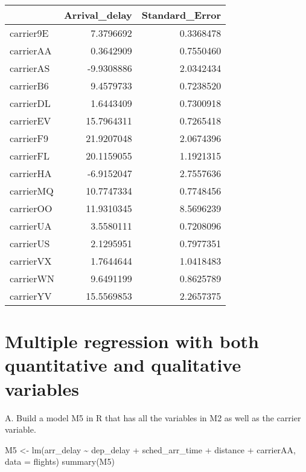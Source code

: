 \documentclass[
]{article}
\newenvironment{Shaded}{\begin{snugshade}}{\end{snugshade}}
\newcommand{\AttributeTok}[1]{\textcolor[rgb]{0.77,0.63,0.00}{#1}}
\newcommand{\FunctionTok}[1]{\textcolor[rgb]{0.00,0.00,0.00}{#1}}
\newcommand{\NormalTok}[1]{#1}
\newcommand{\OtherTok}[1]{\textcolor[rgb]{0.56,0.35,0.01}{#1}}
\newcommand{\SpecialCharTok}[1]{\textcolor[rgb]{0.00,0.00,0.00}{#1}}
\begin{document}
\begin{longtable}[]{@{}lrr@{}}
\toprule()
& Arrival\_delay & Standard\_Error \\
\midrule()
\endhead
carrier9E & 7.3796692 & 0.3368478 \\
carrierAA & 0.3642909 & 0.7550460 \\
carrierAS & -9.9308886 & 2.0342434 \\
carrierB6 & 9.4579733 & 0.7238520 \\
carrierDL & 1.6443409 & 0.7300918 \\
carrierEV & 15.7964311 & 0.7265418 \\
carrierF9 & 21.9207048 & 2.0674396 \\
carrierFL & 20.1159055 & 1.1921315 \\
carrierHA & -6.9152047 & 2.7557636 \\
carrierMQ & 10.7747334 & 0.7748456 \\
carrierOO & 11.9310345 & 8.5696239 \\
carrierUA & 3.5580111 & 0.7208096 \\
carrierUS & 2.1295951 & 0.7977351 \\
carrierVX & 1.7644644 & 1.0418483 \\
carrierWN & 9.6491199 & 0.8625789 \\
carrierYV & 15.5569853 & 2.2657375 \\
\bottomrule()
\end{longtable}

\hypertarget{multiple-regression-with-both-quantitative-and-qualitative-variables}{%
\section{Multiple regression with both quantitative and qualitative
variables}\label{multiple-regression-with-both-quantitative-and-qualitative-variables}}

A. Build a model M5 in R that has all the variables in M2 as well as the
carrier variable.

\begin{Shaded}
\begin{Highlighting}[]
\NormalTok{M5 }\OtherTok{\textless{}{-}} \FunctionTok{lm}\NormalTok{(arr\_delay }\SpecialCharTok{\textasciitilde{}}\NormalTok{ dep\_delay }\SpecialCharTok{+}\NormalTok{ sched\_arr\_time }\SpecialCharTok{+}\NormalTok{ distance }\SpecialCharTok{+}
\NormalTok{    carrierAA, }\AttributeTok{data =}\NormalTok{ flights)}
\FunctionTok{summary}\NormalTok{(M5)}
\end{Highlighting}
\end{Shaded}
\end{document}
